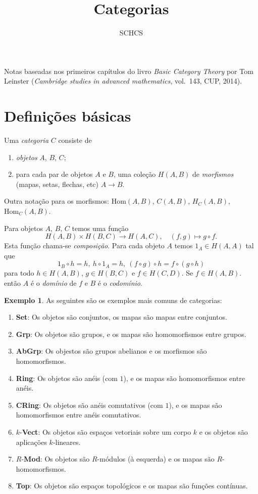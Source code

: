 \documentclass[12pt]{amsart}
\theoremstyle{definition}
\newtheorem{example}[theorem]{Exemplo}
\begin{document}
\title{Categorias}
\author{SCHCS}
\maketitle

Notas baseadas nos primeiros capítulos do livro \emph{Basic Category Theory} por Tom Leinster 
(\emph{Cambridge studies in advanced mathematics}, vol.\ 143, CUP, 2014).

\section{Definições básicas}
Uma \emph{categoria} $C$ consiste de 
\begin{enumerate}
\item \emph{objetos} $A$, $B$, $C$;
\item para cada par de objetos $A$ e $B$, uma coleção $H(A,B)$ de \emph{morfismos} (mapas, setas, flechas, 
etc) $A\to B$. 
\end{enumerate}

Outra notação para os morfismos: $\mbox{Hom}(A,B)$, $C(A,B)$, $H_C(A,B)$, $\mbox{Hom}_C(A,B)$.

Para objetos $A$, $B$, $C$ temos uma função 
$$
H(A,B) \times H(B,C)\to H(A,C),\quad (f,g)\mapsto g\circ f.
$$
Esta função chama-se \emph{composição}. Para cada objeto $A$ temos $1_A\in H(A,A)$ tal que 
$$
1_B\circ h=h,\ h\circ 1_A=h,\ (f\circ g)\circ h=f\circ(g\circ h)
$$
para todo $h\in H(A,B)$, $g\in H(B,C)$ e $f\in H(C,D)$. Se $f\in H(A,B)$. então $A$ é o \emph{domínio} de $f$ e 
$B$ é o \emph{codomínio}.

\begin{example}
As seguintes são os exemplos mais comuns de categorias:

\begin{enumerate}
\item {\bf Set}: Os objetos são conjuntos, os mapas são mapas entre conjuntos.
\item {\bf Grp}: Os objetos são grupos, e os mapas são homomorfismos entre grupos. 
\item {\bf AbGrp}: Os objestos são grupos abelianos e os morfismos são homomorfismos.
\item {\bf Ring}: Os objetos são anéis (com $1$), e os mapas são homomorfismos entre anéis.
\item {\bf CRing}: Os objetos são anéis comutativos (com $1$), e os mapas são homomorfismos entre anéis 
comutativos.
\item $k$-{\bf Vect}: 
Os objetos são espaços vetoriais sobre um corpo $k$ e os objetos são aplicações $k$-lineares.
\item $R$-{\bf Mod}: Os objetos são $R$-módulos (à esquerda) e os mapas são $R$-homomorfismos. 
\item {\bf Top}: Os objetos são espaços topológicos e os mapas são funções contínuas.
\end{enumerate}
\end{example}
\end{document}
